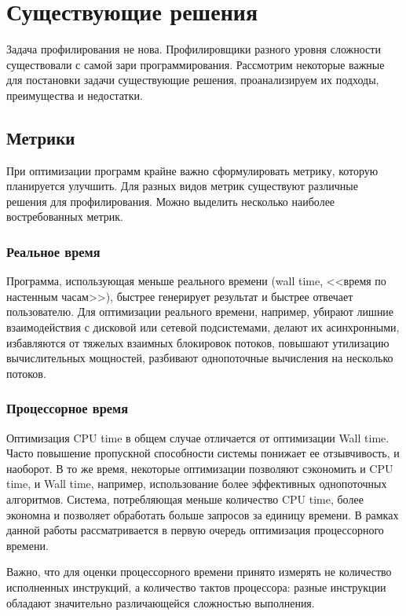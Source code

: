 \section{Существующие решения}
Задача профилирования не нова.
Профилировщики разного уровня сложности существовали с самой зари программирования.
Рассмотрим некоторые важные для постановки задачи существующие решения, проанализируем их подходы, преимущества и недостатки.

\subsection{Метрики}
При оптимизации программ крайне важно сформулировать метрику, которую планируется улучшить.
Для разных видов метрик существуют различные решения для профилирования.
Можно выделить несколько наиболее востребованных метрик.

\subsubsection{Реальное время}
Программа, использующая меньше реального времени (wall time, <<время по настенным часам>>),
быстрее генерирует результат и быстрее отвечает пользователю.
Для оптимизации реального времени, например, убирают лишние взаимодействия с дисковой или сетевой подсистемами,
делают их асинхронными, избавляются от тяжелых взаимных блокировок потоков,
повышают утилизацию вычислительных мощностей, разбивают однопоточные вычисления на несколько потоков.

\subsubsection{Процессорное время}
Оптимизация CPU time в общем случае отличается от оптимизации Wall time.
Часто повышение пропускной способности системы понижает ее отзывчивость, и наоборот.
В то же время, некоторые оптимизации позволяют сэкономить и CPU time, и Wall time, например, использование более эффективных однопоточных алгоритмов.
Система, потребляющая меньше количество CPU time, более экономна и позволяет обработать больше запросов за единицу времени.
В рамках данной работы рассматривается в первую очередь оптимизация процессорного времени.

Важно, что для оценки процессорного времени принято измерять не количество исполненных инструкций, а количество тактов процессора:
разные инструкции обладают значительно различающейся сложностью выполнения.

